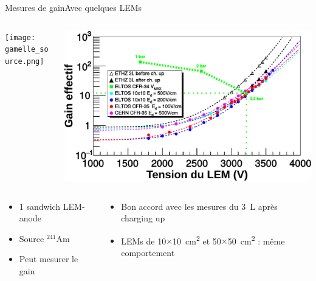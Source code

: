     \begin{frame}{Mesures de gain}{Avec quelques LEMs}
    	\begin{scriptsize}
    		\begin{columns}
    			\begin{column}{0.46\textwidth}
    				\centering \texttt{[image: gamelle\_source.png]}
    			\end{column}\hfill
    			\begin{column}{0.58\textwidth}
    				\centering \includegraphics[width=\textwidth]{./pictures/New_LEM_Gain.pdf}
    			\end{column}
    		\end{columns}\vfill
    		\begin{columns}
    			\begin{column}{0.38\textwidth}
    				\begin{itemize}
    					\item 1 sandwich LEM-anode
    					\item Source $^{241}$Am
    					\item Peut mesurer le gain
    				\end{itemize}
    			\end{column}\hfill
    			\begin{column}{0.58\textwidth}
    				\begin{itemize}
        				\item Bon accord avec les mesures du \SI{3}{\liter} après charging up
    					\item LEMs de 10$\times$\SI{10}{\centi\meter\squared} et 50$\times$\SI{50}{\centi\meter\squared} : même comportement

\end{itemize}
\end{column}
\end{columns}
\end{scriptsize}
\end{frame}
